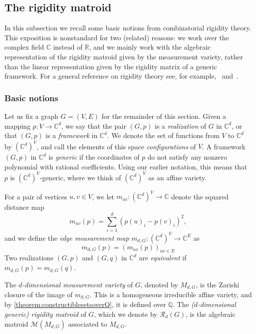 \documentclass[11pt,a4paper,dvipsnames]{scrartcl}
\theoremstyle{definition}
\newcommand{\RR}{\mathbb{R}}
\newcommand{\CC}{\mathbb{C}}
\newcommand{\QQ}{\mathbb{Q}}
\newcommand{\algmat}[1]{\mathcal{M}(#1)}
\begin{document}
\subsection{The rigidity matroid}\label{subsection:rigiditymatroid}

In this subsection we recall some basic notions from combinatorial rigidity theory. This exposition is nonstandard for two (related) reasons: we work over the complex field $\CC$ instead of $\RR$, and we mainly work with the algebraic representation of the rigidity matroid given by the measurement variety, rather than the linear representation given by the rigidity matrix of a generic framework. For a general reference on rigidity theory see, for example,~\cite{jordan.whiteley_2017} and~\cite{schulze.whiteley_2017}.

\subsubsection{Basic notions}
Let us fix a graph $G = (V,E)$ for the remainder of this section. Given a mapping $p: V \rightarrow \CC^d$, we say that the pair $(G,p)$ is a \emph{realization} of $G$ in $\CC^d$, or that $(G,p)$ is a \emph{framework} in $\CC^d$. We denote the set of functions from $V$ to $\CC^d$ by $(\CC^{d})^V$, and call the elements of this space \emph{configurations} of $V$. 
A framework $(G,p)$ in $\CC^d$ is \emph{generic} if the coordinates of $p$ do not satisfy any nonzero polynomial with rational coefficients. Using our earlier notation, this means that $p$ is $(\CC^{d})^V$-generic, where we think of $(\CC^{d})^V$ as an affine variety.

For a pair of vertices $u,v \in V$, we let $m_{uv} : (\CC^{d})^V \rightarrow \CC$ denote the squared distance map \[m_{uv}(p) = \sum_{i=1}^d {({p(u)}_i - {p(v)}_i)}^2,\] and we define the \emph{edge measurement map} $m_{d,G} : (\CC^{d})^V \rightarrow \CC^E$ as \[m_{d,G}(p) = {(m_{uv}(p))}_{uv \in E}\] Two realizations $(G,p)$ and $(G,q)$ in $\CC^d$ are \emph{equivalent} if $m_{d,G}(p) = m_{d,G}(q)$. 

The \emph{$d$-dimensional measurement variety} of $G$, denoted by $M_{d,G}$, is the Zariski closure of the image of $m_{d,G}$. This is a homogeneous irreducible affine variety, and by \cref{theorem:constructiblesetsoverQ}, it is defined over $\QQ$. 
The \emph{($d$-dimensional generic) rigidity matroid} of $G$, which we denote by $\mathcal{R}_d(G)$, is the algebraic matroid $\algmat{M_{d,G}}$ associated to $M_{d,G}$.
\end{document}
